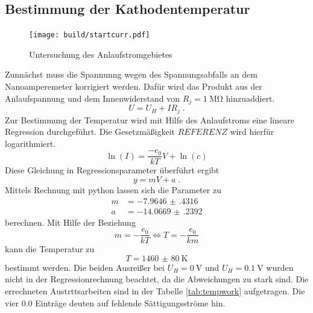 \subsection{Bestimmung der Kathodentemperatur}
\begin{figure}
    \centering
    \caption{Untersuchung des Anlaufstromgebietes}
    \label{fig:startcurr}
    \texttt{[image: build/startcurr.pdf]}
\end{figure}
Zunnächst muss die Spannunng wegen des Spannungsabfalls an dem Nanoamperemeter korrigiert werden.
Dafür wird das Produkt aus der Anlaufspannung und dem Innenwiderstand von $R_j = \SI{1}{\mega\ohm}$ hinzuaddiert.
\begin{equation}
    U = U_H + I R_j \; \text{.}
\end{equation}
Zur Bestimmung der Temperatur wird mit Hilfe des Anlaufstroms eine lineare Regression durchgeführt. 
Die Gesetzmäßigkeit $REFERENZ$ wird hierfür logarithmiert.
\begin{equation}
    \ln \left ( I \right ) = \frac{-e_0}{kT} V + \ln \left (c \right )
\end{equation}
Diese Gleichung in Regressionsparameter überführt ergibt
\begin{equation}
    y = mV + a \; \text{.}
\end{equation}
Mittels Rechnung mit python lassen sich die Parameter zu 
\begin{align*}
    m &= \num{-7.9646(4316)} \\
    a &= \num{-14.0669(2392)}
\end{align*}
berechnen.
Mit Hilfe der Beziehung 
\begin{equation}
    m = -\frac{e_0}{kT} \iff T = -\frac{e_0}{km}
\end{equation}
kann die Temperatur zu 
\begin{equation*}
    T = \SI{1460(80)}{\kelvin} 
\end{equation*}
bestimmt werden.
Die beiden Ausreißer bei $U_H = \SI{0}{\volt}$ und $U_H = \SI{0.1}{\volt}$ wurden nicht in der Regressionrechnung beachtet, da die Abweichungen zu stark sind.
Die errechneten Austrttsarbeiten sind in der Tabelle \ref{tab:tempwork} aufgetragen. Die vier $0.0$ Einträge deuten auf fehlende Sättigungsströme hin.
